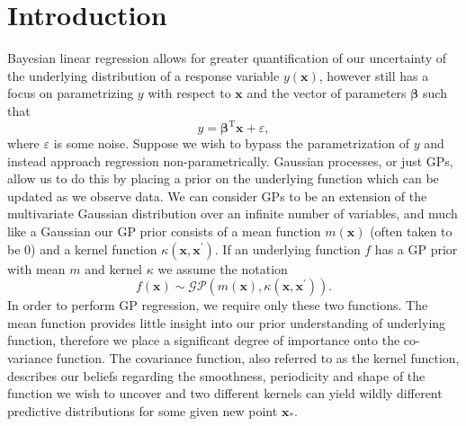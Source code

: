 \documentclass[10pt,a4paper]{article}
\newcommand{\Beta}{\boldsymbol\beta}
\newcommand{\BetaT}{\Beta^{\text{T}}}
\numberwithin{equation}{section}
\theoremstyle{plain}
\theoremstyle{definition}
\theoremstyle{own}
\begin{document}
\section{Introduction}
Bayesian linear regression allows for greater quantification of our uncertainty of the underlying distribution of a response variable $y(\mathbf{x})$, however still has a focus on parametrizing $y$ with respect to $\mathbf{x}$ and the vector of parameters $\Beta$ such that
\begin{equation}
y = \BetaT \mathbf{x} + \varepsilon,
\end{equation}
where $\varepsilon$ is some noise. Suppose we wish to bypass the parametrization of $y$ and instead approach regression non-parametrically. Gaussian processes, or just GPs, allow us to do this by placing a prior on the underlying function which can be updated as we observe data. We can consider GPs to be an extension of the multivariate Gaussian distribution over an infinite number of variables, and much like a Gaussian our GP prior consists of a mean function $m(\mathbf{x})$ (often taken to be $0$) and a kernel function $\kappa(\mathbf{x}, \mathbf{x}^{\prime})$. If an underlying function $f$ has a GP prior with mean $m$ and kernel $\kappa$ we assume the notation
\begin{equation}
f(\mathbf{x}) \sim \mathcal{GP}(m(\mathbf{x}), \kappa(\mathbf{x}, \mathbf{x}^{\prime})).
\end{equation}
In order to perform GP regression, we require only these two functions. The mean function provides little insight into our prior understanding of underlying function, therefore we place a significant degree of importance onto the co-variance function. The covariance function, also referred to as the kernel function, describes our beliefs regarding the smoothness, periodicity and shape of the function we wish to uncover and two different kernels can yield wildly different predictive distributions for some given new point $\mathbf{x}_*$.
\end{document}
